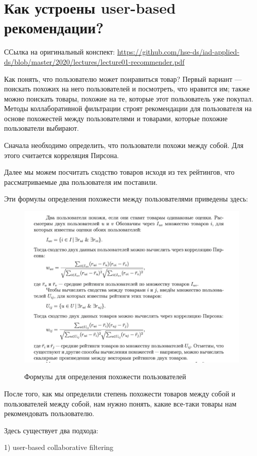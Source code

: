 	\section{Как устроены user-based рекомендации?
} 

 ССылка на оригинальный конспект: \url{https://github.com/hse-ds/iad-applied-ds/blob/master/2020/lectures/lecture01-recommender.pdf}
	
	
	Как понять, что пользователю может понравиться товар? Первый вариант — поискать похожих на него пользователей и посмотреть, что нравится им; также можно поискать товары, похожие на те, которые этот пользователь уже покупал. Методы коллаборативной фильтрации строят рекомендации для пользователя на основе похожестей между пользователями и товарами, которые похожие пользователи выбирают.
	
	Сначала необходимо определить, что пользователи похожи между собой. Для этого считается корреляция Пирсона. 
	
	Далее мы можем посчитать сходство товаров исходя из тех рейтингов, что рассматриваемые два пользователя им поставили. 
	
	Эти формулы определения похожести между пользователями приведены здесь:
	
\begin{figure}[H]
\centering
\includegraphics[width=0.7\linewidth]{16_memory1.jpg}
\label{fig:16_memory1} 
\caption{Формулы для определения похожести пользователей}
\end{figure}
	
	
	После того, как мы определили степень похожести товаров между собой и пользователей между собой, нам нужно понять, какие все-таки товары нам рекомендовать пользователю.
	
	Здесь существует два подхода:
	
	1) user-based collaborative filtering 
	
